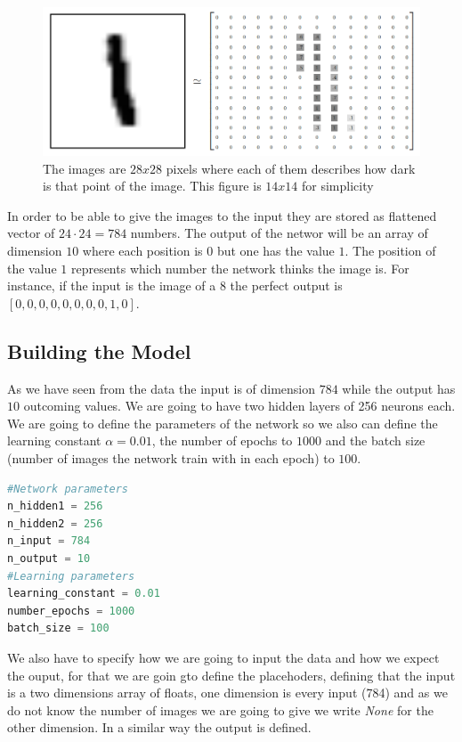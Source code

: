 \begin{figure}
  \center
  \includegraphics[scale=0.4]{images/MNIST-Matrix.png}
  \caption{The images are $28x28$ pixels where each of them describes how dark is that point of the image. This figure is $14x14$ for simplicity ~\cite{colah} }
  \label{fig:mnist}
\end{figure}

In order to be able to give the images to the input they are stored as flattened vector of $24\cdot24=784$ numbers. The output of the networ will be an array of dimension $10$ where each position is $0$ but one has the value $1$. The position of the value $1$ represents which number the network thinks the image is. For instance, if the input is the image of a $8$ the perfect output is $[0,0,0,0,0,0,0,0,1,0]$.

\subsection{Building the Model}
As we have seen from the data the input is of dimension $784$ while the output has $10$ outcoming values. We are going to have two hidden layers of 256 neurons each. We are going to define the parameters of the network so we also can define the learning constant $\alpha=0.01$, the number of epochs to $1000$ and the batch size (number of images the network train with in each epoch) to $100$.

\begin{lstlisting}[language=python]
#Network parameters
n_hidden1 = 256
n_hidden2 = 256
n_input = 784
n_output = 10
#Learning parameters
learning_constant = 0.01
number_epochs = 1000
batch_size = 100
\end{lstlisting}

We also have to specify how we are going to input the data and how we expect the ouput, for that we are goin gto define the placehoders, defining that the input is a two dimensions array of floats, one dimension is every input (784) and as we do not know the number of images we are going to give we write \textit{None} for the other dimension. In a similar way the output is defined.

